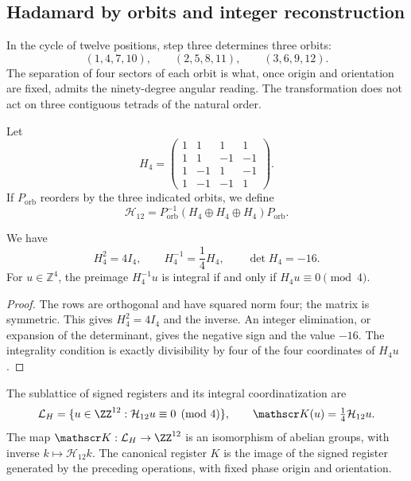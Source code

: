 \subsection{Hadamard by orbits and integer reconstruction}
\label{x_reciprocidad:subsec:k-hadamard}

In the cycle of twelve positions, step three determines three orbits:
\[
 (1,4,7,10),\qquad(2,5,8,11),\qquad(3,6,9,12).
\]
The separation of four sectors of each orbit is what, once
origin and orientation are fixed, admits the ninety-degree angular reading. The
transformation does not act on three contiguous tetrads of the natural order.

Let
\[
 H_4=\begin{pmatrix}
 1&1&1&1\\1&1&-1&-1\\1&-1&1&-1\\1&-1&-1&1
 \end{pmatrix}.
\]
If \(P_{\mathrm{orb}}\) reorders by the three indicated orbits,
we define
\[
 \mathcal H_{12}=P_{\mathrm{orb}}^{-1}
 (H_4\oplus H_4\oplus H_4)P_{\mathrm{orb}}.
\]

\begin{lemma}
\label{x_reciprocidad:lem:k-hadamard}
We have
\[
 H_4^2=4I_4,\qquad H_4^{-1}=\frac14H_4,\qquad\det H_4=-16.
\]
For \(u\in\mathbb Z^4\), the preimage \(H_4^{-1}u\) is integral if and
only if \(H_4u\equiv0\pmod4\).
\end{lemma}

\begin{proof}
The rows are orthogonal and have squared norm four; the matrix is
symmetric. This gives \(H_4^2=4I_4\) and the inverse. An integer elimination,
or expansion of the determinant, gives the negative sign and the value \(-16\).
The integrality condition is exactly divisibility by four
of the four coordinates of \(H_4u\).
\end{proof}

\begin{definition}
The sublattice of signed registers and its integral coordinatization are
\[
 \mathcal L_H=\{u\in\ZZ^{12}:\mathcal H_{12}u\equiv0\pmod4\},
 \qquad \mathscr K(u)=\tfrac14\mathcal H_{12}u.
\]
The map \(\mathscr K:\mathcal L_H\to\ZZ^{12}\) is an isomorphism
of abelian groups, with inverse \(k\mapsto\mathcal H_{12}k\).
The canonical register \(K\) is the image of the signed register generated
by the preceding operations, with fixed phase origin and orientation.
\end{definition}

